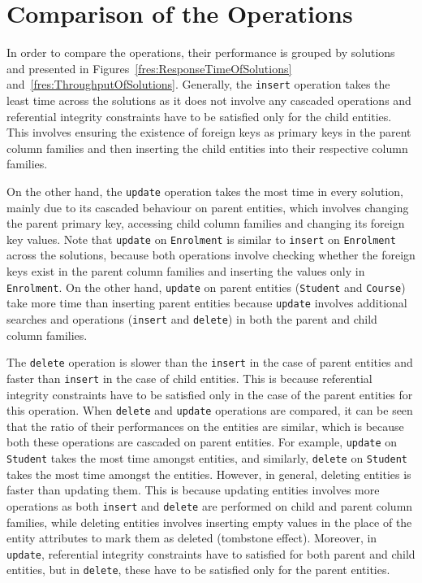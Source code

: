 \section{Comparison of the Operations} \label{s:comparisonOfOperations}
 
In order to compare the operations,  their performance  is grouped by solutions
and presented in Figures~\ref{fres:ResponseTimeOfSolutions}
and~\ref{fres:ThroughputOfSolutions}. 
Generally,  the \texttt{insert} operation takes the least time across the
solutions as it does not involve any cascaded operations and referential
integrity constraints have to be satisfied only for the child entities.  This
involves ensuring the existence of foreign keys as primary keys in the parent
column families and then inserting the child entities into their respective
column families. 

On the other hand,   the \texttt{update} operation takes the most time  in every
solution,   mainly due to its cascaded behaviour on parent entities,   which
involves changing the parent primary key,   accessing child column families and
changing its foreign key values.  Note that \texttt{update} on \texttt{Enrolment}
is similar to \texttt{insert} on \texttt{Enrolment} across the solutions, 
because both operations involve checking whether the foreign keys exist in the
parent column families and inserting the values only in \texttt{Enrolment}. 
On the other hand,   \texttt{update} on parent entities (\texttt{Student} and
\texttt{Course})  take more time than inserting parent entities because
\texttt{update} involves additional searches and operations (\texttt{insert} and
\texttt{delete}) in both the parent and child column families. 

The \texttt{delete} operation is slower than the \texttt{insert} in the case of
parent entities and faster than \texttt{insert} in the case of child entities. 
This is because  referential integrity constraints have to be satisfied only in
the case of the  parent entities for this operation. 
When \texttt{delete} and \texttt{update} operations are compared,  it can be seen
that the ratio of their performances  on the entities are similar,  which is
because both these operations are cascaded on parent entities. 
For example,  \texttt{update} on \texttt{Student} takes the most time amongst
entities,  and similarly,  \texttt{delete} on \texttt{Student} takes the most time
amongst the entities.  However,  in general,  deleting entities is faster than
updating them.  This is because updating entities involves more operations as
both \texttt{insert} and \texttt{delete} are performed on  child and
parent column families,  while deleting entities involves inserting empty values
in the place of the entity attributes to mark them as deleted (tombstone
effect).  Moreover,  in \texttt{update},  referential integrity constraints
have to satisfied for both parent and child entities,  but in
\texttt{delete},  these have to be satisfied only for the parent entities. 

